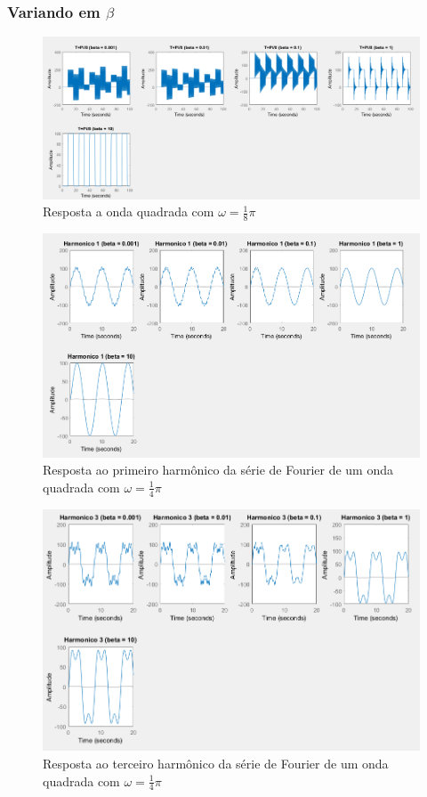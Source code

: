 \documentclass[a4paper, 12pt]{article}
\begin{document}
			\subsubsection{Variando em $\beta$}
			\begin{figure}[!ht]
				\centering
				\includegraphics[scale=0.46]{img/3f_beta.png}
				\caption{Resposta a onda quadrada com $\omega = \frac{1}{8}\pi$}	
			\end{figure}			
			\begin{figure}[!ht]
				\centering
				\includegraphics[scale=0.57]{img/3g_beta.png}
				\caption{Resposta ao primeiro harmônico da série de Fourier de um onda quadrada com $\omega = \frac{1}{4}\pi$}	
			\end{figure}		
			\begin{figure}[!ht]
				\centering
				\includegraphics[scale=0.52]{img/3h_beta.png}
				\caption{Resposta ao terceiro harmônico da série de Fourier de um onda quadrada com $\omega = \frac{1}{4}\pi$}	
			\end{figure}			
\end{document}
